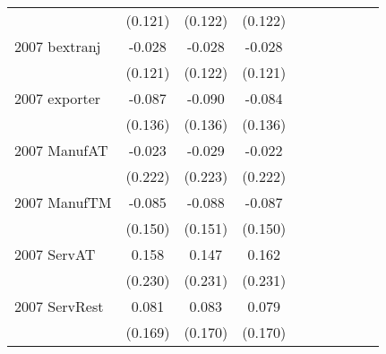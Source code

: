 \begin{table}[htbp]
\begin{tabular}{l*{9}{c}}
                    &     (0.121)   &     (0.122)   &     (0.122)   &               &               &               &               &               &               \\
2007 bextranj       &      -0.028   &      -0.028   &      -0.028   &               &               &               &               &               &               \\
                    &     (0.121)   &     (0.122)   &     (0.121)   &               &               &               &               &               &               \\
2007 exporter       &      -0.087   &      -0.090   &      -0.084   &               &               &               &               &               &               \\
                    &     (0.136)   &     (0.136)   &     (0.136)   &               &               &               &               &               &               \\
2007 ManufAT        &      -0.023   &      -0.029   &      -0.022   &               &               &               &               &               &               \\
                    &     (0.222)   &     (0.223)   &     (0.222)   &               &               &               &               &               &               \\
2007 ManufTM        &      -0.085   &      -0.088   &      -0.087   &               &               &               &               &               &               \\
                    &     (0.150)   &     (0.151)   &     (0.150)   &               &               &               &               &               &               \\
2007 ServAT         &       0.158   &       0.147   &       0.162   &               &               &               &               &               &               \\
                    &     (0.230)   &     (0.231)   &     (0.231)   &               &               &               &               &               &               \\
2007 ServRest       &       0.081   &       0.083   &       0.079   &               &               &               &               &               &               \\
                    &     (0.169)   &     (0.170)   &     (0.170)   &               &               &               &               &               &               \\

\end{tabular}
\end{table}
